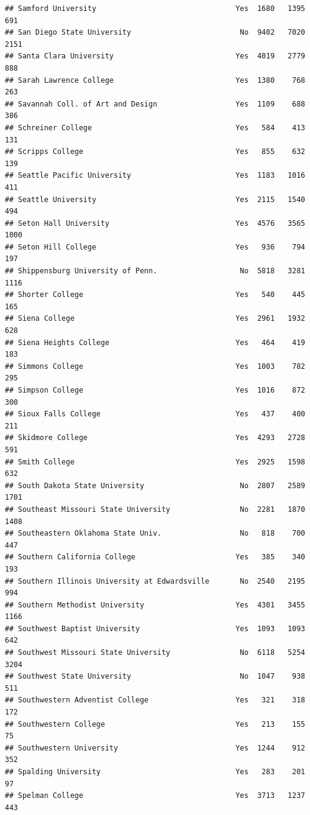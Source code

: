\documentclass[
]{article}
\begin{document}
\begin{verbatim}
## Samford University                                Yes  1680   1395    691
## San Diego State University                         No  9402   7020   2151
## Santa Clara University                            Yes  4019   2779    888
## Sarah Lawrence College                            Yes  1380    768    263
## Savannah Coll. of Art and Design                  Yes  1109    688    386
## Schreiner College                                 Yes   584    413    131
## Scripps College                                   Yes   855    632    139
## Seattle Pacific University                        Yes  1183   1016    411
## Seattle University                                Yes  2115   1540    494
## Seton Hall University                             Yes  4576   3565   1000
## Seton Hill College                                Yes   936    794    197
## Shippensburg University of Penn.                   No  5818   3281   1116
## Shorter College                                   Yes   540    445    165
## Siena College                                     Yes  2961   1932    628
## Siena Heights College                             Yes   464    419    183
## Simmons College                                   Yes  1003    782    295
## Simpson College                                   Yes  1016    872    300
## Sioux Falls College                               Yes   437    400    211
## Skidmore College                                  Yes  4293   2728    591
## Smith College                                     Yes  2925   1598    632
## South Dakota State University                      No  2807   2589   1701
## Southeast Missouri State University                No  2281   1870   1408
## Southeastern Oklahoma State Univ.                  No   818    700    447
## Southern California College                       Yes   385    340    193
## Southern Illinois University at Edwardsville       No  2540   2195    994
## Southern Methodist University                     Yes  4301   3455   1166
## Southwest Baptist University                      Yes  1093   1093    642
## Southwest Missouri State University                No  6118   5254   3204
## Southwest State University                         No  1047    938    511
## Southwestern Adventist College                    Yes   321    318    172
## Southwestern College                              Yes   213    155     75
## Southwestern University                           Yes  1244    912    352
## Spalding University                               Yes   283    201     97
## Spelman College                                   Yes  3713   1237    443

\end{verbatim}
\end{document}
